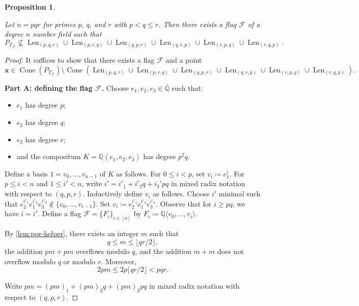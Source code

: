\documentclass[letterpaper,10pt]{amsart}
\DeclareMathOperator{\Len}{Len}
\DeclareMathOperator{\Cone}{Cone}
\newcommand{\QQ}{\mathbb{Q}}      %
\newcommand{\la}{\langle}
\newcommand{\ra}{\rangle}
\newcommand{\cF}{\mathcal{F}}
\newtheorem{proposition}[theorem]{Proposition}
\theoremstyle{definition}
\theoremstyle{remark}
\begin{document}
\begin{proposition}
\label{lem:pqr}

Let $n = pqr$ for primes $p$, $q$, and $r$ with $p < q \leq r$. Then there exists a flag $\cF$ of a degree $n$ number field such that 
\[
	P_{T_{\cF}} \not \subseteq \Len_{(p,q,r)} \cup \Len_{(p,r,q)} \cup \Len_{(q,p,r)} \cup \Len_{(q,r,p)} \cup \Len_{(r,p,q)} \cup \Len_{(r,q,p)}.
\]
\end{proposition}
\begin{proof}

It suffices to show that there exists a flag $\cF$ and a point
\[
	\mathbf{x} \in \Cone(P_{T_{\cF}}) \setminus \Cone( \Len_{(p,q,r)} \cup \Len_{(p,r,q)} \cup \Len_{(q,p,r)} \cup \Len_{(q,r,p)} \cup \Len_{(r,p,q)} \cup \Len_{(r,q,p)}).
\] 

\noindent \textbf{Part A: defining the flag $\cF$.} Choose $e_1,e_2,e_3 \in \overline{\QQ}$ such that:
\begin{itemize}
    \item $e_1$ has degree $p$;
    \item $e_2$ has degree $q$;
    \item $e_3$ has degree $r$;
    \item and the compositum $K = \QQ(e_1,e_2,e_3)$ has degree $p^2q$.
\end{itemize}

Define a basis ${1=v_0,\dots,v_{n-1}}$ of $K$ as follows. For $0 \leq i < p$, set $v_i \coloneqq e_1^i$. For $p \leq i < n$ and $1 \leq i' < n$, write $i' = i'_1 + i'_2q + i_3'pq$ in mixed radix notation with respect to $(q,p,r)$. Inductively define $v_i$ as follows. Choose $i'$ minimal such that $e_2^{i'_1}e_1^{i'_2}e_3^{i'_3} \notin \{v_0,\dots,v_{i-1}\}$. Set $v_i \coloneqq e_2^{i'_1}e_1^{i'_2}e_3^{i'_3}$. Observe that for $i \geq pq$, we have $i = i'$. Define a flag $\cF = \{F_i\}_{i \in [n]}$ by $F_i \coloneqq \QQ\la v_0,\dots,v_i \ra$.

By \cref{lem:pqr-helper}, there exists an integer $m$ such that 
\[
	q \leq m \leq \lfloor qr/2 \rfloor,
\]
the addition $pm + pm$ overflows modulo $q$, and the addition $m + m$ does not overflow modulo $q$ or modulo $r$. Moreover, 
\[
	2pm \leq 2p \lfloor qr/2 \rfloor < pqr.
\]

Write $pm = (pm)_1 + (pm)_2 q + (pm)_3 pq$ in mixed radix notation with respect to $(q,p,r)$. 


\end{proof}
\end{document}
